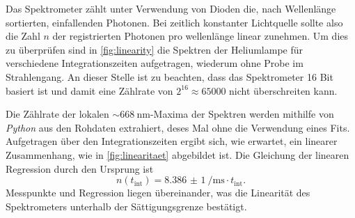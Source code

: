 \documentclass[../bericht.tex]{subfiles}
\begin{document}
        Das Spektrometer zählt unter Verwendung von Dioden die, nach Wellenlänge sortierten, einfallenden Photonen. Bei zeitlich konstanter Lichtquelle sollte also die Zahl $n$ der registrierten Photonen pro wellenlänge linear zunehmen. Um dies zu überprüfen sind in \cref{fig:linearity} die Spektren der Heliumlampe für verschiedene Integrationszeiten aufgetragen, wiederum ohne Probe im Strahlengang. An dieser Stelle ist zu beachten, dass das Spektrometer 16 Bit basiert ist und damit eine Zählrate von $2^{16}\approx 65000$ nicht überschreiten kann.

        Die Zählrate der lokalen $\sim\SI{668}{\nano\meter}$-Maxima der Spektren werden mithilfe von \textit{Python} aus den Rohdaten extrahiert, deses Mal ohne die Verwendung eines Fits. Aufgetragen über den Integrationszeiten ergibt sich, wie erwartet, ein linearer Zusammenhang, wie in \cref{fig:linearitaet} abgebildet ist. Die Gleichung der linearen Regression durch den Ursprung ist
        \begin{equation}
          n(t_\mathrm{int})=\SI{8,386(1)}{\per\milli\second} \cdot t_\mathrm{int}.
          \label{eq:linear-fit}
        \end{equation}
        Messpunkte und Regression liegen übereinander, was die Linearität des Spektrometers unterhalb der Sättigungsgrenze bestätigt.
\end{document}
